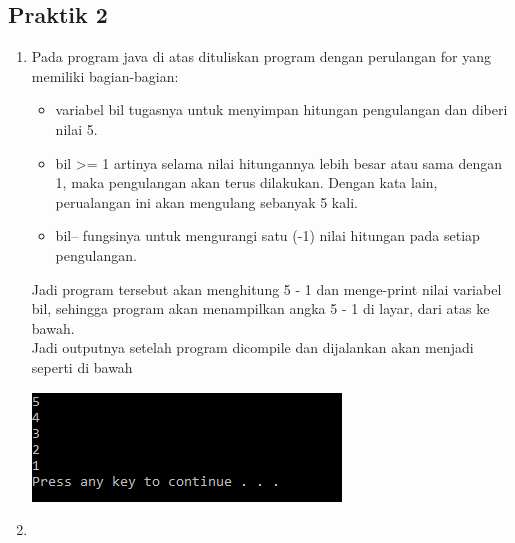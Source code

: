\documentclass[a4paper,12pt]{article}
\begin{document}
\subsection{Praktik 2}
\begin{enumerate}[label=\alph*.]
	\item 
	\begin{minipage}[t]{\linewidth}
		\raggedright
	\end{minipage}
	Pada program java di atas dituliskan program dengan perulangan for yang memiliki bagian-bagian:
	\begin{itemize}
		\item     variabel bil tugasnya untuk menyimpan hitungan pengulangan dan diberi nilai 5.
		\item bil >= 1 artinya selama nilai hitungannya lebih besar atau sama dengan 1, maka pengulangan akan terus dilakukan. Dengan kata lain, perualangan ini akan mengulang sebanyak 5 kali.
		\item bil-- fungsinya untuk mengurangi satu (-1) nilai hitungan pada setiap pengulangan.
	\end{itemize}
	Jadi program tersebut akan menghitung 5 - 1 dan menge-print nilai variabel bil, sehingga program akan menampilkan angka 5 - 1 di layar, dari atas ke bawah.\\
	Jadi outputnya setelah program dicompile dan dijalankan akan menjadi seperti di bawah
	\begin{center}
		\includegraphics[scale=1]{Capture6}
	\end{center}
	\newpage
	\item 
	\begin{minipage}[t]{\linewidth}
		\raggedright
\end{minipage}
\end{enumerate}
\end{document}
